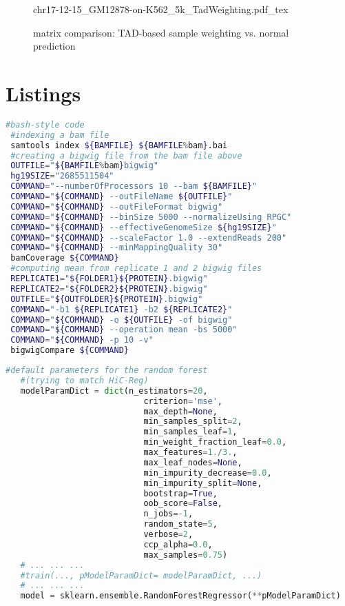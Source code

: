 \begin{appendices}
 \begin{figure}[hb]
 \centering
 \scriptsize
 {chr17-12-15_GM12878-on-K562_5k_TadWeighting.pdf_tex}
 \caption{matrix comparison: TAD-based sample weighting vs. normal prediction}
 \label{fig:app:GM12878:K562:chr17:TadWeighting}
\end{figure}

\clearpage
\section*{Listings}

\begin{lstlisting}[language=bash, caption=bam to bigwig, label=list:methods:bamtobigwig]
 #bash-style code
 #indexing a bam file
 samtools index ${BAMFILE} ${BAMFILE%bam}.bai
 #creating a bigwig file from the bam file above
 OUTFILE="${BAMFILE%bam}bigwig"
 hg19SIZE="2685511504"
 COMMAND="--numberOfProcessors 10 --bam ${BAMFILE}" 
 COMMAND="${COMMAND} --outFileName ${OUTFILE}"
 COMMAND="${COMMAND} --outFileFormat bigwig" 
 COMMAND="${COMMAND} --binSize 5000 --normalizeUsing RPGC"
 COMMAND="${COMMAND} --effectiveGenomeSize ${hg19SIZE}"
 COMMAND="${COMMAND} --scaleFactor 1.0 --extendReads 200"
 COMMAND="${COMMAND} --minMappingQuality 30"
 bamCoverage ${COMMAND}
 #computing mean from replicate 1 and 2 bigwig files
 REPLICATE1="${FOLDER1}${PROTEIN}.bigwig"
 REPLICATE2="${FOLDER2}${PROTEIN}.bigwig"
 OUTFILE="${OUTFOLDER}${PROTEIN}.bigwig"
 COMMAND="-b1 ${REPLICATE1} -b2 ${REPLICATE2}"
 COMMAND="${COMMAND} -o ${OUTFILE} -of bigwig"
 COMMAND="${COMMAND} --operation mean -bs 5000"
 COMMAND="${COMMAND} -p 10 -v"
 bigwigCompare ${COMMAND}
\end{lstlisting}

\begin{lstlisting}[language=python, caption=hicprediction random forest, label=list:methods:RandomForestRegressor]
   #default parameters for the random forest 
   #(trying to match HiC-Reg)
   modelParamDict = dict(n_estimators=20,
                            criterion='mse', 
                            max_depth=None, 
                            min_samples_split=2, 
                            min_samples_leaf=1, 
                            min_weight_fraction_leaf=0.0, 
                            max_features=1./3.,
                            max_leaf_nodes=None, 
                            min_impurity_decrease=0.0, 
                            min_impurity_split=None, 
                            bootstrap=True, 
                            oob_score=False, 
                            n_jobs=-1, 
                            random_state=5, 
                            verbose=2, 
                            ccp_alpha=0.0, 
                            max_samples=0.75)
   # ... ... ...
   #train(..., pModelParamDict= modelParamDict, ...)
   # ... ... ... 
   model = sklearn.ensemble.RandomForestRegressor(**pModelParamDict)
\end{lstlisting}


\end{appendices}
